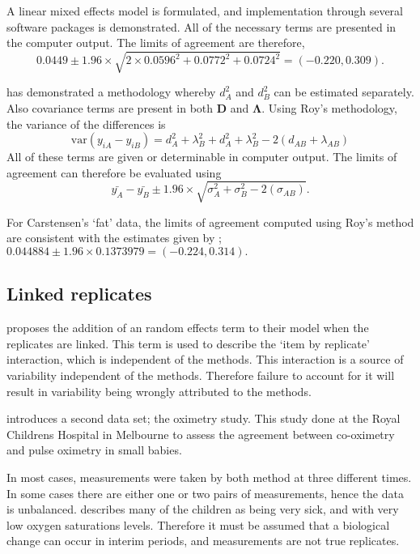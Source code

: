 \documentclass[12pt, a4paper]{report}
\theoremstyle{plain}
\theoremstyle{definition}
\theoremstyle{remark}
\begin{document}
A linear mixed effects model is formulated, and implementation through several software packages is demonstrated.
All of the necessary terms are presented in the computer output. The limits of agreement are therefore,
\begin{equation}
0.0449  \pm 1.96 \times  \sqrt{2 \times 0.0596^2 + 0.0772^2 + 0.0724^2} = (-0.220,  0.309).
\end{equation}

\citet{ARoy2009} has demonstrated a methodology whereby $d^2_{A}$ and $d^2_{B}$ can be estimated separately. Also covariance terms are present in both $\boldsymbol{D}$ and $\boldsymbol{\Lambda}$. Using Roy's methodology, the variance of the differences is
\begin{equation}
\mbox{var} (y_{iA}-y_{iB})= d^2_{A} + \lambda^2_{B} + d^2_{A} + \lambda^2_{B} - 2(d_{AB} + \lambda_{AB})
\end{equation}
All of these terms are given or determinable in computer output.
The limits of agreement can therefore be evaluated using
\begin{equation}
\bar{y_{A}}-\bar{y_{B}} \pm 1.96 \times \sqrt{ \sigma^2_{A} + \sigma^2_{B}  - 2(\sigma_{AB})}.
\end{equation}

For Carstensen's `fat' data, the limits of agreement computed using Roy's
method are consistent with the estimates given by \citet{BXC2008}; $0.044884  \pm 1.96 \times  0.1373979 = (-0.224,  0.314).$

\subsection{Linked replicates}

\citet{BXC2008} proposes the addition of an random effects term to their model when the replicates are linked. This term is used to describe the `item by replicate' interaction, which is independent of the methods. This interaction is a source of variability independent of the methods. Therefore failure to account for it will result in variability being wrongly attributed to the methods.

\citet{BXC2008} introduces a second data set; the oximetry study. This study done at the Royal Childrens Hospital in
Melbourne to assess the agreement between co-oximetry and pulse oximetry in small babies.

In most cases, measurements were taken by both method at three different times. In some cases there are either one or two pairs of measurements, hence the data is unbalanced. \citet{BXC2008} describes many of the children as being very sick, and with very low oxygen saturations levels. Therefore it must be assumed that a biological change can occur in interim periods, and measurements are not true replicates.
\end{document}

